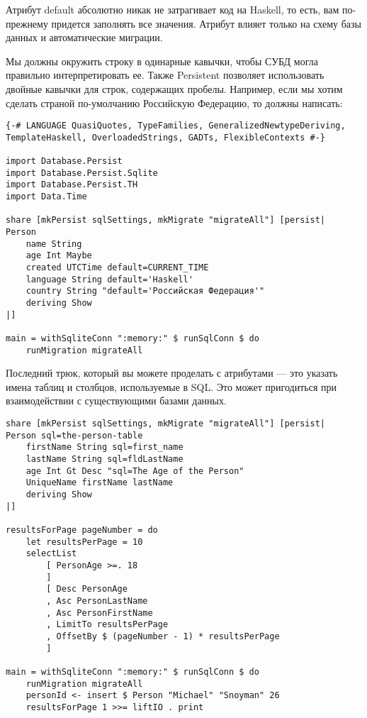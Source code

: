 \begin{remark}
Атрибут default абсолютно никак не затрагивает код на Haskell, то есть, вам по-прежнему придется заполнять все значения. Атрибут влияет только на схему базы данных и автоматические миграции.
\end{remark}

Мы должны окружить строку в одинарные кавычки, чтобы СУБД могла правильно интерпретировать ее. Также Persistent позволяет использовать двойные кавычки для строк, содержащих пробелы. Например, если мы хотим сделать страной по-умолчанию Российскую Федерацию, то должны написать:

\begin{lstlisting}
{-# LANGUAGE QuasiQuotes, TypeFamilies, GeneralizedNewtypeDeriving, TemplateHaskell, OverloadedStrings, GADTs, FlexibleContexts #-}

import Database.Persist
import Database.Persist.Sqlite
import Database.Persist.TH
import Data.Time

share [mkPersist sqlSettings, mkMigrate "migrateAll"] [persist|
Person
    name String
    age Int Maybe
    created UTCTime default=CURRENT_TIME
    language String default='Haskell'
    country String "default='Российская Федерация'"
    deriving Show
|]

main = withSqliteConn ":memory:" $ runSqlConn $ do
    runMigration migrateAll
\end{lstlisting}%

Последний трюк, который вы можете проделать с атрибутами --- это указать имена таблиц и столбцов, используемые в SQL. Это может пригодиться при взаимодействии с существующими базами данных.

\begin{lstlisting}
share [mkPersist sqlSettings, mkMigrate "migrateAll"] [persist|
Person sql=the-person-table
    firstName String sql=first_name
    lastName String sql=fldLastName
    age Int Gt Desc "sql=The Age of the Person"
    UniqueName firstName lastName
    deriving Show
|]

resultsForPage pageNumber = do
    let resultsPerPage = 10
    selectList
        [ PersonAge >=. 18
        ]
        [ Desc PersonAge
        , Asc PersonLastName
        , Asc PersonFirstName
        , LimitTo resultsPerPage
        , OffsetBy $ (pageNumber - 1) * resultsPerPage
        ]

main = withSqliteConn ":memory:" $ runSqlConn $ do
    runMigration migrateAll
    personId <- insert $ Person "Michael" "Snoyman" 26
    resultsForPage 1 >>= liftIO . print
\end{lstlisting}%

